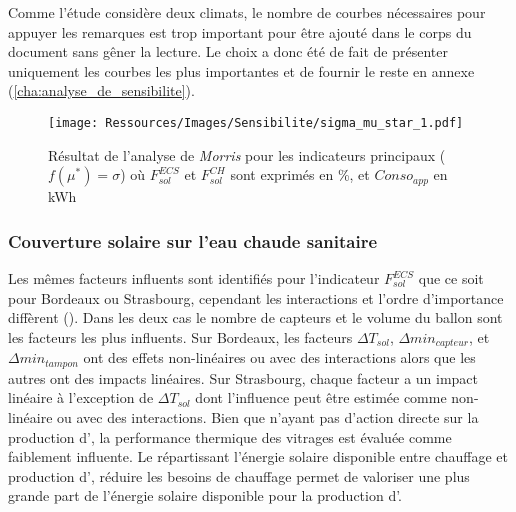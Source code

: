 Comme l’étude considère deux climats, le nombre de courbes nécessaires pour appuyer
les remarques est trop important pour être ajouté dans le corps du document sans gêner
la lecture. Le choix a donc été de fait de présenter uniquement les courbes les plus
importantes et de fournir le reste en annexe (\ref{cha:analyse_de_sensibilite}).

\begin{figure}
    \centering
    \texttt{[image: Ressources/Images/Sensibilite/sigma\_mu\_star\_1.pdf]}
    \caption[Résultat de l’analyse de \textit{Morris} pour les indicateurs principaux]
            {Résultat de l’analyse de \textit{Morris} pour les indicateurs principaux
             ($f(\mu^{*}) = \sigma$) où $F_{sol}^{ECS}$ et $F_{sol}^{CH}$ sont exprimés
             en \si{\percent}, et $Conso_{app}$ en \si{kWh}}
    \label{fig:objectifs_mu_star}
\end{figure}


\subsubsection{Couverture solaire sur l’eau chaude sanitaire} %
\label{ssub:couverture_solaire_sur_l_ECS}
Les mêmes facteurs influents sont identifiés pour l’indicateur $F_{sol}^{ECS}$ que ce soit
pour Bordeaux ou Strasbourg, cependant les interactions et l’ordre d’importance diffèrent
(). Dans les deux cas le nombre de capteurs  et le
volume du ballon  sont les facteurs les plus influents. Sur Bordeaux, les
facteurs $\Delta T_{sol}$, $\Delta min_{capteur}$, et $\Delta min_{tampon}$ ont des effets
non-linéaires ou avec des interactions alors que les autres ont des impacts linéaires. Sur
Strasbourg, chaque facteur a un impact linéaire à l’exception de $\Delta T_{sol}$ dont
l’influence peut être estimée comme non-linéaire ou avec des interactions. Bien que
n’ayant pas d’action directe sur la production d’, la performance thermique des
vitrages est évaluée comme faiblement influente. Le  répartissant l’énergie
solaire disponible entre chauffage et production d’, réduire les besoins de
chauffage permet de valoriser une plus grande part de l’énergie solaire disponible pour la
production d’.


